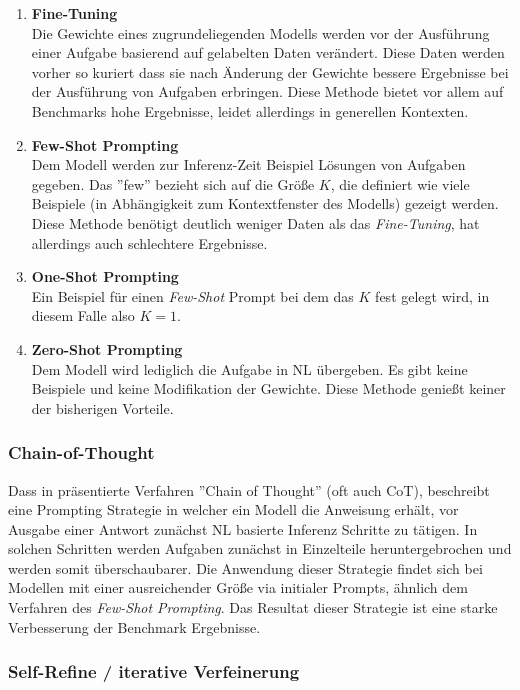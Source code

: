 \begin{enumerate}
    \item \textbf{Fine-Tuning} \\ Die Gewichte eines zugrundeliegenden Modells werden vor der Ausführung einer Aufgabe basierend auf gelabelten Daten verändert. Diese Daten werden vorher so kuriert dass sie nach Änderung der Gewichte bessere Ergebnisse bei der Ausführung von Aufgaben erbringen. Diese Methode bietet vor allem auf Benchmarks hohe Ergebnisse, leidet allerdings in generellen Kontexten.
    \item \textbf{Few-Shot Prompting} \\ Dem Modell werden zur Inferenz-Zeit Beispiel Lösungen von Aufgaben gegeben. Das ''few'' bezieht sich auf die Größe $K$, die definiert wie viele Beispiele (in Abhängigkeit zum Kontextfenster des Modells) gezeigt werden. Diese Methode benötigt deutlich weniger Daten als das \textit{Fine-Tuning}, hat allerdings auch schlechtere Ergebnisse.
    \item \textbf{One-Shot Prompting} \\ Ein Beispiel für einen \textit{Few-Shot} Prompt bei dem das $K$ fest gelegt wird, in diesem Falle also $K=1$.
    \item \textbf{Zero-Shot Prompting} \\ Dem Modell wird lediglich die Aufgabe in NL übergeben. Es gibt keine Beispiele und keine Modifikation der Gewichte. Diese Methode genießt keiner der bisherigen Vorteile. 
\end{enumerate}

\subsubsection{Chain-of-Thought}

Dass in \cite{weiChainofThoughtPromptingElicits2022} präsentierte Verfahren ''Chain of Thought'' (oft auch CoT), beschreibt eine Prompting Strategie in welcher ein Modell die Anweisung erhält, vor Ausgabe einer Antwort zunächst NL basierte Inferenz Schritte zu tätigen. In solchen Schritten werden Aufgaben zunächst in Einzelteile heruntergebrochen und werden somit überschaubarer. Die Anwendung dieser Strategie findet sich bei Modellen mit einer ausreichender Größe via initialer Prompts, ähnlich dem Verfahren des \textit{Few-Shot Prompting}. Das Resultat dieser Strategie ist eine starke Verbesserung der Benchmark Ergebnisse.

\subsubsection{Self-Refine / iterative Verfeinerung}

